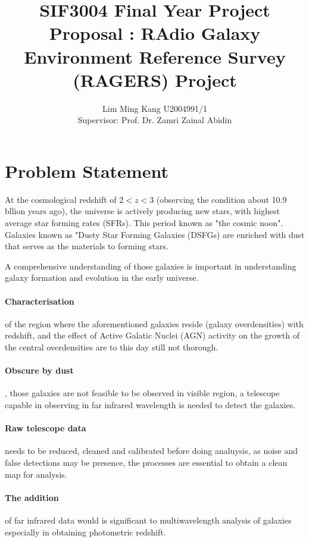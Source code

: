 \documentclass{article}
\title{SIF3004 Final Year Project Proposal : RAdio Galaxy Environment Reference Survey (RAGERS) Project }
\author{Lim Ming Kang U2004991/1\\[0.3cm]{Supervisor: Prof. Dr. Zamri Zainal Abidin}}
\begin{document}
\maketitle
\section{Problem Statement}

At the cosmological redshift of $2 < z < 3$ (observing the condition about 10.9 bllion years ago), the universe is actively producing new stars, with highest average star forming rates (SFRs). This period known as "the cosmic noon"\cite{Schreiber2020}. Galaxies known as "Dusty Star Forming Galaxies (DSFGs) are enriched with dust that serves as the materials to forming stars.
\medskip

\noindent A comprehensive understanding of those galaxies is important in understanding galaxy formation and evolution in the early universe.\cite{Geach2016}


\paragraph{Characterisation}of the region where the aforementioned galaxies reside (galaxy overdensities) with redshift, and the effect of Active Galatic Nuclei (AGN) activity on the growth of the central overdensities are to this day still not thorough.\cite{Ragers2021}

\paragraph{Obscure by dust}, those galaxies are not feasible to be observed in visible region, a telescope capable in observing in far infrared wavelength is needed to detect the galaxies.

\paragraph{Raw telescope data}needs to be reduced, cleaned and calibrated before doing analuysis, as noise and false detections may be presence, the processes are essential to obtain a clean map for analysis. 

\paragraph{The addition}of far infrared data would is significant to multiwavelength analysis of galaxies especially in obtaining photometric redshift.
\end{document}
